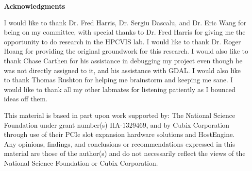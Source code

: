 \newpage
{}
\begin{center}
  \bf {Acknowledgments}
\end{center}

I would like to thank Dr. Fred Harris, Dr. Sergiu Dascalu, and Dr. Eric Wang for being on my committee, with special thanks to Dr. Fred Harris for giving me the opportunity to do research in the HPCVIS lab. I would like to thank Dr. Roger Hoang for providing the original groundwork for this research. I would also like to thank Chase Carthen for his assistance in debugging my project even though he was not directly assigned to it, and his assistance with GDAL. I would also like to thank Thomas Rushton for helping me brainstorm and keeping me sane. I would like to thank all my other labmates for listening patiently as I bounced ideas off them. 

This material is based in part upon work supported by: The National Science Foundation under grant number(s) IIA-1329469, and by Cubix Corporation through use of their PCIe slot expansion hardware solutions and HostEngine. Any opinions, findings, and conclusions or recommendations expressed in this material are those of the author(s) and do not necessarily reflect the views of the National Science Foundation or Cubix Corporation.